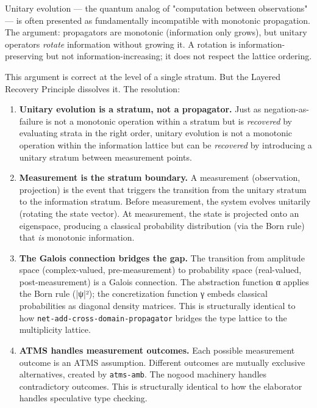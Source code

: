 \documentclass[11pt]{article}
\begin{document}
Unitary evolution --- the quantum analog of "computation between observations"
--- is often presented as fundamentally incompatible with monotonic propagation.
The argument: propagators are monotonic (information only grows), but unitary
operators \emph{rotate} information without growing it. A rotation is
information-preserving but not information-increasing; it does not respect the
lattice ordering.

This argument is correct at the level of a single stratum. But the Layered
Recovery Principle dissolves it. The resolution:

\begin{enumerate}
\item \textbf{Unitary evolution is a stratum, not a propagator.} Just as negation-as-failure
is not a monotonic operation within a stratum but is \emph{recovered} by evaluating
strata in the right order, unitary evolution is not a monotonic operation within
the information lattice but can be \emph{recovered} by introducing a unitary stratum
between measurement points.

\item \textbf{Measurement is the stratum boundary.} A measurement (observation, projection)
is the event that triggers the transition from the unitary stratum to the
information stratum. Before measurement, the system evolves unitarily (rotating
the state vector). At measurement, the state is projected onto an eigenspace,
producing a classical probability distribution (via the Born rule) that \emph{is}
monotonic information.

\item \textbf{The Galois connection bridges the gap.} The transition from amplitude space
(complex-valued, pre-measurement) to probability space (real-valued,
post-measurement) is a Galois connection. The abstraction function α applies
the Born rule (|ψ|²); the concretization function γ embeds classical
probabilities as diagonal density matrices. This is structurally identical to
how \texttt{net-add-cross-domain-propagator} bridges the type lattice to the
multiplicity lattice.

\item \textbf{ATMS handles measurement outcomes.} Each possible measurement outcome is an
ATMS assumption. Different outcomes are mutually exclusive alternatives,
created by \texttt{atms-amb}. The nogood machinery handles contradictory outcomes.
This is structurally identical to how the elaborator handles speculative
type checking.
\end{enumerate}
\end{document}
